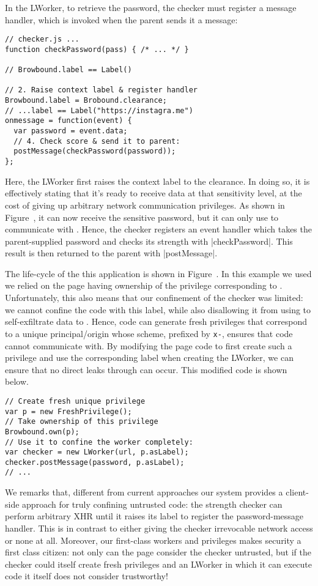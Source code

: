 In the LWorker, to retrieve the password, the checker must register a
message handler, which is invoked when the parent sends it a message:
\begin{lstlisting}
// checker.js ...
function checkPassword(pass) { /* ... */ }

// Browbound.label == Label()

// 2. Raise context label & register handler
Browbound.label = Brobound.clearance;
// ...label == Label("https://instagra.me")
onmessage = function(event) {
  var password = event.data;
  // 4. Check score & send it to parent:
  postMessage(checkPassword(password));
};
\end{lstlisting}
%
Here, the LWorker first raises the context label to the clearance.
%
In doing so, it is effectively stating that it's ready to receive data
at that sensitivity level, at the cost of giving up arbitrary network
communication privileges.
%
As shown in Figure~, it can now receive the
sensitive password, but it can only use \xhr{} to communicate with
.
%
Hence, the checker registers an event handler which takes the
parent-supplied password and checks its strength with
\js|checkPassword|.
%
This result is then returned to the parent with \js|postMessage|.

The life-cycle of the this application is shown in
Figure~.
%
In this example we used we relied on the page having ownership of the
privilege corresponding to .
%
Unfortunately, this also means that our confinement of the checker was
limited: we cannot confine the code with this label, while also
disallowing it from using \xhr{} to self-exfiltrate data to
.
%
Hence, code can generate fresh privileges that correspond to a unique
principal/origin whose scheme, prefixed by \texttt{x-}, ensures that
code cannot communicate with.
%
By modifying the page code to first create such a privilege and use
the corresponding label when creating the LWorker, we can ensure that
no direct leaks through \xhr{} can occur.
%
This modified code is shown below.
\begin{lstlisting}
// Create fresh unique privilege
var p = new FreshPrivilege();
// Take ownership of this privilege
Browbound.own(p);
// Use it to confine the worker completely:
var checker = new LWorker(url, p.asLabel);
checker.postMessage(password, p.asLabel);
// ...
\end{lstlisting}
%

%
We remarks that, different from current approaches our system provides
a client-side approach for truly confining untrusted code: the strength
checker can perform arbitrary XHR until it raises its label to
register the password-message handler.
%
This is in contrast to either giving the checker irrevocable network
access or none at all.
%
Moreover, our first-class workers and privileges makes security a
first class citizen: not only can the page consider the checker
untrusted, but if the checker could itself create fresh privileges and
an LWorker in which it can execute code it itself does not consider
trustworthy!

